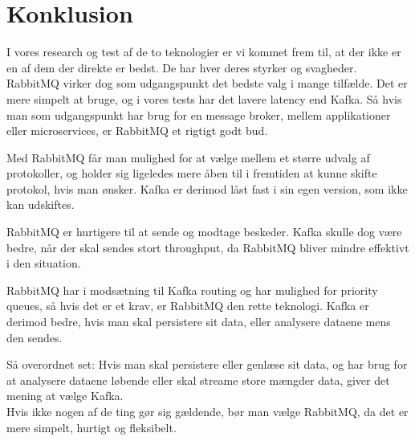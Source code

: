 \documentclass[
]{article}
\begin{document}
\pagebreak
\hypertarget{konklusion}{%
\section{Konklusion}\label{konklusion}}

I vores research og test af de to teknologier er vi kommet frem til, at
der ikke er en af dem der direkte er bedst. De har hver deres styrker og
svagheder.\\
RabbitMQ virker dog som udgangspunkt det bedste valg i mange tilfælde.
Det er mere simpelt at bruge, og i vores tests har det lavere latency
end Kafka. Så hvis man som udgangspunkt har brug for en message broker,
mellem applikationer eller microservices, er RabbitMQ et rigtigt godt
bud.

Med RabbitMQ får man mulighed for at vælge mellem et større udvalg af
protokoller, og holder sig ligeledes mere åben til i fremtiden at kunne
skifte protokol, hvis man ønsker. Kafka er derimod låst fast i sin egen
version, som ikke kan udskiftes.

RabbitMQ er hurtigere til at sende og modtage beskeder. Kafka skulle dog
være bedre, når der skal sendes stort throughput, da RabbitMQ bliver
mindre effektivt i den situation.

RabbitMQ har i modsætning til Kafka routing og har mulighed for priority
queues, så hvis det er et krav, er RabbitMQ den rette teknologi. Kafka
er derimod bedre, hvis man skal persistere sit data, eller analysere
dataene mens den sendes.

Så overordnet set: Hvis man skal persistere eller genlæse sit data, og
har brug for at analysere dataene løbende eller skal streame store
mængder data, giver det mening at vælge Kafka.\\
Hvis ikke nogen af de ting gør sig gældende, bør man vælge RabbitMQ, da
det er mere simpelt, hurtigt og fleksibelt.
\pagebreak

\end{document}

